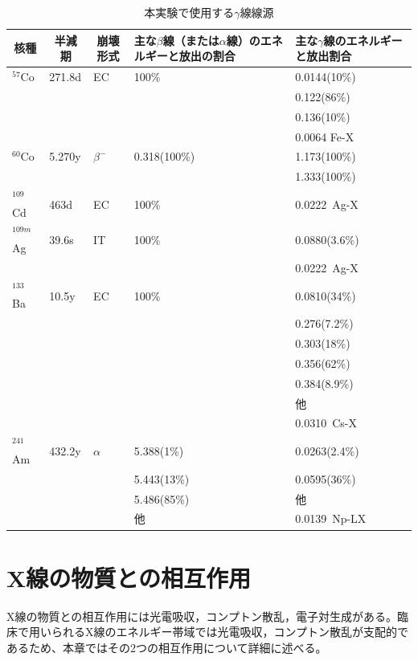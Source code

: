 \begin{table}[H]
\begin{center}
\begin{tabular}{|l|l|l|l|l|} \hline
\multicolumn{1}{|c|}{核種} & \multicolumn{1}{c|}{半減期} & \multicolumn{1}{c|}{崩壊形式} &\parbox{12zw}{主な$\beta$線（または$\alpha$線）のエネルギーと放出の割合} & \parbox{10zw}{主な$\gamma$線のエネルギーと放出割合} \\\hline
$^{57}$Co & 271.8d & EC & 100$\%$ & 0.0144(10\%) \\
 &  &  &  & 0.122(86\%) \\
 &  &  &  & 0.136(10\%) \\
 &  &  &  & 0.0064 Fe-X \\\hline
$^{60}$Co & 5.270y & $\beta^{-}$ & 0.318(100\%) & 1.173(100\%) \\
 &  &  &  & 1.333(100\%) \\\hline
$^{109}$Cd & 463d & EC & 100\% & 0.0222\ Ag-X \\
$^{109m}$Ag & 39.6s & IT & 100\% & 0.0880(3.6\%) \\
 &  &  &  & 0.0222\ Ag-X \\\hline
$^{133}$Ba & 10.5y & EC & 100\% & 0.0810(34\%) \\
 &  &  &  & 0.276(7.2\%) \\
 &  &  &  & 0.303(18\%) \\
 &  &  &  & 0.356(62\%) \\
 &  &  &  & 0.384(8.9\%) \\
 &  &  &  & 他 \\
 &  &  &  & 0.0310\ Cs-X \\\hline
$^{241}$Am & 432.2y & $\alpha$ & 5.388(1\%) & 0.0263(2.4\%) \\
 &  &  & 5.443(13\%) & 0.0595(36\%) \\
 &  &  & 5.486(85\%) & 他 \\
 &  &  & 他 & 0.0139\ Np-LX \\\hline
\end{tabular}
\end{center}
\caption{本実験で使用する$\gamma$線線源\cite{RI}}
\label{RI}
\end{table}

\fi
%

\section{X線の物質との相互作用}
X線の物質との相互作用には光電吸収，コンプトン散乱，電子対生成がある。臨床で用いられるX線のエネルギー帯域では光電吸収，コンプトン散乱が支配的であるため、本章ではその2つの相互作用について詳細に述べる。
